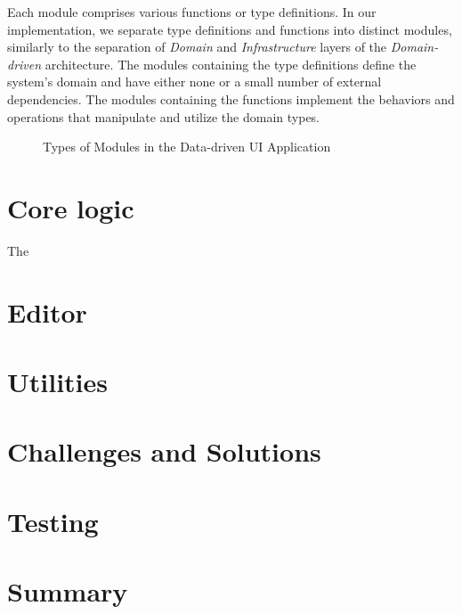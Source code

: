 Each module comprises various functions or type definitions.
In our implementation, we separate type definitions and functions into distinct modules, similarly to the separation of \emph{Domain} and \emph{Infrastructure} layers of the \emph{Domain-driven} architecture.
The modules containing the type definitions define the system's domain and have either none or a small number of external dependencies.
The modules containing the functions implement the behaviors and operations that manipulate and utilize the domain types.

\begin{figure}[htbp]
	\centering
	\caption{Types of Modules in the Data-driven UI Application}
	\label{fig:architecture}
\end{figure}



\section{Core logic}

The
\section{Editor}
\label{sec:ui}

\section{Utilities}


\section{Challenges and Solutions}

\section{Testing}

\section{Summary}
